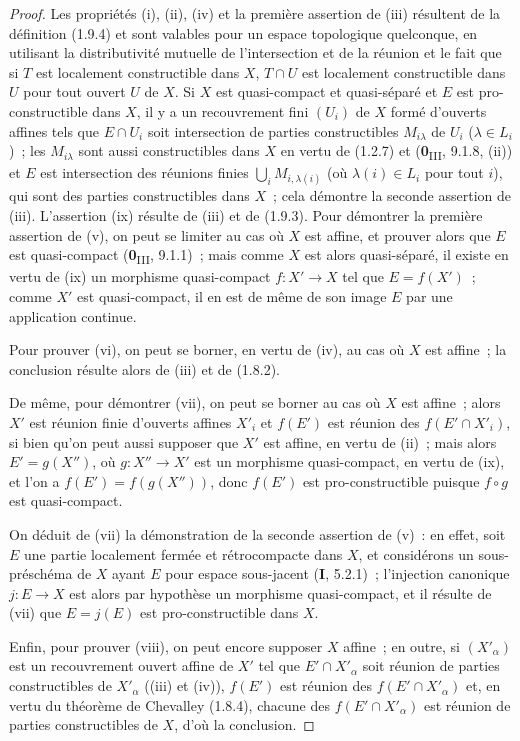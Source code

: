 \begin{proof}
Les propriétés (i), (ii), (iv) et la première assertion de (iii) résultent
de la définition (1.9.4) et sont valables pour un espace topologique
quelconque, en utilisant la distributivité mutuelle de l'intersection et de
la réunion et le fait que si $T$ est localement constructible dans $X$,
$T\cap U$ est localement constructible dans $U$ pour tout ouvert $U$ de $X$.
Si $X$ est quasi-compact et quasi-séparé et $E$ est pro-constructible dans
$X$, il y a un recouvrement fini $(U_i)$ de $X$ formé d'ouverts affines tels
que $E\cap U_i$ soit intersection de parties constructibles $M_{i\lambda}$
de $U_i$ ($\lambda\in L_i$)~; les $M_{i\lambda}$ sont aussi constructibles
dans $X$ en vertu de (1.2.7) et (\textbf{0}\textsubscript{III}, 9.1.8, (ii)) et $E$ est
intersection des réunions finies $\bigcup_iM_{i,\lambda(i)}$ (où
$\lambda(i)\in L_i$ pour tout $i$), qui sont des parties constructibles dans
$X$~; cela démontre la seconde assertion de (iii). L'assertion (ix) résulte
de (iii) et de (1.9.3). Pour démontrer la première assertion de (v), on peut
se limiter au cas où $X$ est affine, et prouver alors que $E$ est
quasi-compact (\textbf{0}\textsubscript{III}, 9.1.1)~; mais comme $X$ est alors
quasi-séparé, il existe en vertu de (ix) un morphisme quasi-compact
$f:X'\to X$ tel que $E=f(X')$~; comme $X'$ est quasi-compact, il en est de
même de son image $E$ par une application continue.

Pour prouver (vi), on peut se borner, en vertu de (iv), au cas où $X$ est
affine~; la conclusion résulte alors de (iii) et de (1.8.2).


De même, pour démontrer (vii), on peut se borner au cas où $X$ est affine~;
alors $X'$ est réunion finie d'ouverts affines $X'_i$ et $f(E')$ est réunion
des $f(E'\cap X'_i)$, si bien qu'on peut aussi supposer que $X'$ est affine,
en vertu de (ii)~; mais alors $E'=g(X'')$, où $g:X''\to X'$ est un morphisme
quasi-compact, en vertu de (ix), et l'on a $f(E')=f(g(X''))$, donc $f(E')$ est
pro-constructible puisque $f\circ g$ est quasi-compact.

On déduit de (vii) la démonstration de la seconde assertion de (v)~: en
effet, soit $E$ une partie localement fermée et rétrocompacte dans $X$, et
considérons un sous-préschéma de $X$ ayant $E$ pour espace sous-jacent (\textbf{I},
5.2.1)~; l'injection canonique $j:E\to X$ est alors par hypothèse un
morphisme quasi-compact, et il résulte de (vii) que $E=j(E)$ est
pro-constructible dans $X$.

Enfin, pour prouver (viii), on peut encore supposer $X$ affine~; en outre, si
$(X'_\alpha)$ est un recouvrement ouvert affine de $X'$ tel que
$E'\cap X'_\alpha$ soit réunion de parties constructibles de $X'_\alpha$
((iii) et (iv)), $f(E')$ est réunion des $f(E'\cap X'_\alpha)$ et, en vertu
du théorème de Chevalley (1.8.4), chacune des $f(E'\cap X'_\alpha)$ est
réunion de parties constructibles de $X$, d'où la conclusion.
\end{proof}

